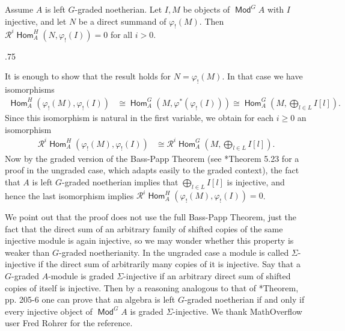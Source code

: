 \documentclass[11pt,fleqn]{article}
\makeatletter
\renewenvironment{proof}[1][\textit{Proof}]{\par
  \pushQED{\qed}%
  \normalfont \topsep.75\paraskip\relax
  \trivlist
  \item[\hskip\labelsep
        \itshape
    #1\@addpunct{.}]\ignorespaces
}{%
  \popQED\endtrivlist\@endpefalse
}
\renewcommand\phi{\varphi}
\newcommand\R{\mathcal R}
\DeclareMathOperator\Mod{\mathsf{Mod}}
\DeclareMathOperator\Hom{\mathsf{Hom}}
\makeatother
\begin{document}
\label{L:acyclic}
\begin{Lemma*}
Assume $A$ is left $G$-graded noetherian. Let $I, M$ be objects of $\Mod^G A$ 
with $I$ injective, and let $N$ be a direct summand of $\phi_!(M)$. Then 
$\R^i\Hom_A^H(N, \phi_!(I)) = 0$ for all $i > 0$.
\end{Lemma*}
\begin{proof}
It is enough to show that the result holds for $N = \phi_!(M)$. In that case 
we have isomorphisms
\begin{align*}
\Hom_A^H(\phi_!(M), \phi_!(I)) 
  &\cong \Hom_A^G(M, \phi^*(\phi_!(I)))
  \cong \Hom_A^G\left(M, \bigoplus_{l \in L} I[l] \right).
\end{align*}
Since this isomorphism is natural in the first variable, we obtain for each 
$i \geq 0$ an isomorphism
\begin{align*}
\R^i \Hom_A^H(\phi_!(M), \phi_!(I)) 
  &\cong\R^i\Hom_A^G\left(M, \bigoplus_{l \in L} I[l] \right).
\end{align*}
Now by the graded version of the Bass-Papp Theorem (see 
\cite{GW-noetherian-book}*{Theorem 5.23} for a proof in 
the ungraded case, which adapts easily to the graded context), the fact that 
$A$ is left $G$-graded noetherian implies that $\bigoplus_{l \in L} I[l]$ is 
injective, and hence the last isomorphism implies $\R^i \Hom_A^H(\phi_!(M), 
\phi_!(I)) = 0$.
\end{proof}

\begin{Remark*}
We point out that the proof does not use the full Bass-Papp Theorem, just the
fact that the direct sum of an arbitrary family of shifted copies of the same 
injective module is again injective, so we may wonder whether this property is 
weaker than $G$-graded noetherianity. In the ungraded case a module is called 
$\Sigma$-injective if the direct sum of arbitrarily many copies of it is
injective. Say that a $G$-graded $A$-module is graded $\Sigma$-injective if an
arbitrary direct sum of shifted copies of itself is injective. Then by a 
reasoning analogous to that of \cite{FW-direcsumreps}*{Theorem, pp. 205-6}
one can prove that an algebra is left $G$-graded noetherian if and only if
every injective object of $\Mod^G A$ is graded $\Sigma$-injective. We thank
MathOverflow user Fred Rohrer for the reference.
\end{Remark*}
\end{document}
